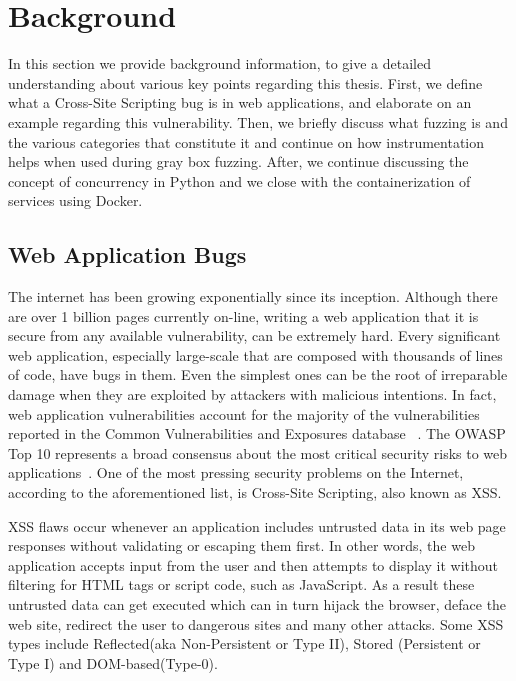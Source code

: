\chapter{Background}
\label{sec:background}
\minitoc
\vspace*{1cm}

In this section we provide background information, to give a detailed understanding about various key points regarding this thesis. First, we define what a Cross-Site Scripting bug is in web applications, and elaborate on an example regarding this vulnerability. Then, we briefly discuss what fuzzing is and the various categories that constitute it and continue on how instrumentation helps when used during gray box fuzzing. After, we continue discussing the concept of concurrency in Python and we close with the containerization of services using Docker.

\section{Web Application Bugs}
The internet has been growing exponentially since its inception. Although there are over 1 billion pages currently on-line, writing a web application that it is secure from any available vulnerability, can be extremely hard. Every significant web application, especially large-scale that are composed with thousands of lines of code, have bugs in them. Even the simplest ones can be the root of irreparable damage when they are exploited by attackers with malicious intentions. In fact, web application vulnerabilities account for the majority of the vulnerabilities reported in the Common Vulnerabilities and Exposures database ~\cite{cve}. The OWASP Top 10 represents a broad consensus about the most critical security risks to web applications~\cite{owasp2017}. One of the most pressing security problems on the Internet, according to the aforementioned list, is Cross-Site Scripting, also known as XSS.

XSS flaws occur whenever an application includes untrusted data in its web page responses without validating or escaping them first. In other words, the web application accepts input from the user and then attempts to display it without filtering for HTML tags or script code, such as JavaScript. As a result these untrusted data can get executed which can in turn hijack the browser, deface the web site, redirect the user to dangerous sites and many other attacks. Some XSS types include Reflected(aka Non-Persistent or Type II), Stored (Persistent or Type I) and DOM-based(Type-0).

